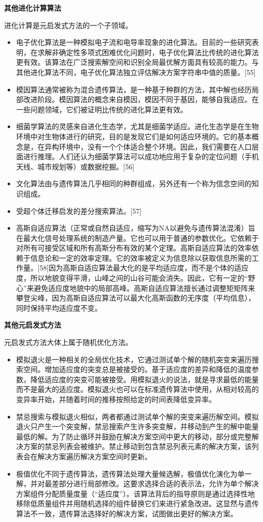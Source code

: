 \textbf{其他进化计算算法}

进化计算是元启发式方法的一个子领域。
\begin{itemize}
\item 电子优化算法是一种模拟电子流和电导率现象的进化算法。目前的一些研究表明，在求解非确定性多项式困难优化问题时，电子优化算法比传统的进化算法更有效。该算法在广泛搜索解空间和识别全局最优解方面具有较高的能力。与其他进化算法不同，电子优化算法独立评估解决方案字符串中值的质量。[55]
\item 模因算法通常被称为混合遗传算法，是一种基于种群的方法，其中解也经历局部改进阶段。模因算法的概念来自模因，模因不同于基因，能够自我适应。在一些问题领域，它们被证明比传统的进化算法更有效。
\item 细菌学算法的灵感来自进化生态学，尤其是细菌学适应。进化生态学是在生物环境中对生物体进行的研究，目的是发现它们是如何适应环境的。它的基本概念是，在异构环境中，没有一个个体适合整个环境。因此，我们需要在人口层面进行推理。人们还认为细菌学算法可以成功地应用于复杂的定位问题（手机天线、城市规划等）或数据挖掘。[56]
\item 文化算法由与遗传算法几乎相同的种群组成，另外还有一个称为信念空间的知识组成。
\item 受超个体迁移启发的差分搜索算法。[57]
\item 高斯自适应算法（正常或自然自适应，缩写为NA以避免与遗传算法混淆）旨在最大化信号处理系统的制造产量。它也可以用于普通的参数优化。它依赖于对所有可接受区域和所有高斯分布有效的某个定理。高斯自适应算法的效率依赖于信息论和一定的效率定理。它的效率被定义为信息除以获取信息所需的工作量。[58]因为高斯自适应算法最大化的是平均适应度，而不是个体的适应度，所以地貌变得平滑，山峰之间的山谷可能会消失。因此，它有一定的“野心”来避免适应度地貌中的局部高峰。高斯自适应算法擅长通过调整矩矩阵来攀登尖峰，因为高斯自适应算法可以最大化高斯函数的无序度（平均信息），同时保持平均适应度不变。
\end{itemize}

\textbf{其他元启发式方法}

元启发式方法大体上属于随机优化方法。
\begin{itemize}
\item 模拟退火是一种相关的全局优化技术，它通过测试单个解的随机突变来遍历搜索空间。增加适应度的突变总是被接受的。基于适应度的差异和降低的温度参数，降低适应度的突变可能被接受。用模拟退火的说法，就是寻求最低的能量而不是最大的适应度。模拟退火也可以在标准遗传算法中使用，从相对较高的变异率开始，并随着时间的推移按照给定的时间表降低变异率。
\item 禁忌搜索与模拟退火相似，两者都通过测试单个解的突变来遍历解空间。模拟退火只产生一个突变解，禁忌搜索产生许多突变解，并移动到产生的解中能量最低的解。为了防止循环并鼓励在解决方案空间中更大的移动，部分或完整解决方案的禁忌列表会被维护。禁止移动到包含禁忌列表元素的解决方案，该列表会在解决方案遍历解决方案空间时更新。
\item 极值优化不同于遗传算法，遗传算法处理大量候选解，极值优化演化为单一解，并对最差部分进行局部修改。这要求选择合适的表示法，允许为单个解决方案组件分配质量度量（“适应度”）。该算法背后的指导原则是通过选择性地移除低质量组件并用随机选择的组件替换它们来进行紧急改进。这显然与遗传算法不一致，遗传算法选择好的解决方案，试图做出更好的解决方案。
\end{itemize}

